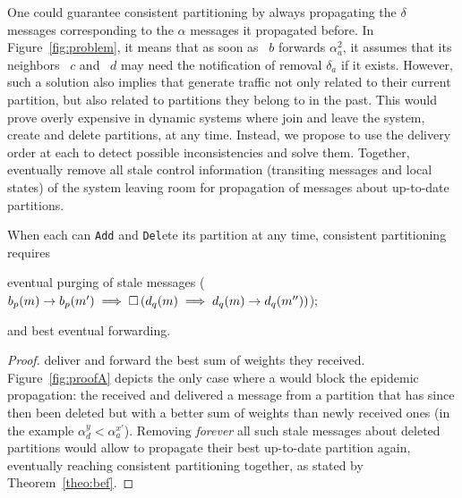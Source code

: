 One could guarantee consistent partitioning by always propagating the
$\delta$ messages corresponding to the $\alpha$ messages it propagated
before. In Figure~\ref{fig:problem}, it means that as soon as
\Process~$b$ forwards $\alpha_a^2$, it assumes that its neighbors
\Process~$c$ and \Process~$d$ may need the notification of removal
$\delta_a$ if it exists. However, such a solution also implies that
\processes generate traffic not only related to their current
partition, but also related to partitions they belong to in the
past. This would prove overly expensive in dynamic systems where
\processes join and leave the system, create and delete partitions, at
any time.  Instead, we propose to use the delivery order at each
\process to detect possible inconsistencies and solve them. Together,
\processes eventually remove all stale control information (transiting
messages and local states) of the system leaving room for propagation
of messages about up-to-date partitions.

\begin{corollary}
%
When each \process can \texttt{Add} and \texttt{Del}ete its partition
at any time, consistent partitioning requires
\begin{inparaenum}[(i)]
\item eventual purging of stale messages ($b_p(m) \rightarrow b_p(m')
  \implies \square\, (d_q(m) \implies d_q(m) \rightarrow
  d_q(m''))$);
\item and best eventual forwarding.
\end{inparaenum}
\end{corollary}

\begin{proof}
  \Processes deliver and forward the best sum of weights they
  received. Figure~\ref{fig:proofA} depicts the only case where a
  \process would block the epidemic propagation: the \process received
  and delivered a message from a partition that has since then been
  deleted but with a better sum of weights than newly received ones
  (in the example $\alpha_d^y < \alpha_a^{x'}$). Removing
  \emph{forever} all such stale messages about deleted partitions
  would allow \processes to propagate their best up-to-date partition
  again, eventually reaching consistent partitioning together, as
  stated by Theorem~\ref{theo:bef}.
\end{proof}



